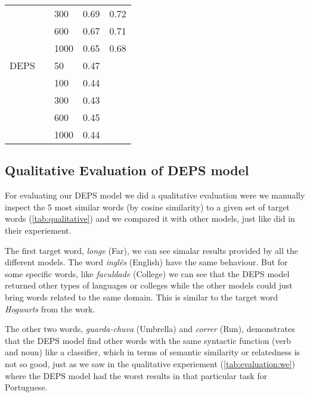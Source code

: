 \begin{table}[]
\begin{minipage}{.65\textwidth}
\begin{tabular}{@{}lllll@{}}
                    &               & 300  & 0.69             & 0.72            \\
                    &               & 600  & 0.67             & 0.71            \\
                    &               & 1000 & 0.65             & 0.68            \\ \cmidrule(r){1-5}
DEPS                &               & 50   & 0.47             \\
                    &               & 100  & 0.44             \\
                    &               & 300  & 0.43             \\
                    &               & 600  & 0.45             \\
                    &               & 1000 & 0.44             \\ \cmidrule(r){1-5}
\end{tabular}
\end{minipage}
\end{table}


\subsection{Qualitative Evaluation of DEPS model}\label{chap:results:qualitative}

For evaluating our DEPS model we did a qualitative evaluation were we manually inspect the 5 most similar words (by cosine similarity) to a given set of target words (\autoref{tab:qualitative}) and we compared it with other models, just like  did in their experiement.

The first target word, \textit{longe} (Far), we can see simalar results provided by all the different models. The word \textit{inglês} (English) have the same behaviour. But for some specific words, like \textit{faculdade} (College) we can see that the DEPS model returned other types of languages or colleges while the other models could just bring words related to the same domain. This is similar to the target word \textit{Hogwarts} from the  work.

The other two words, \textit{guarda-chuva} (Umbrella) and \textit{correr} (Run), demonstrates that the DEPS model find other words with the same syntactic function (verb and noun) like a classifier, which in terms of semantic similarity or relatedness is not so good, just as we saw in the qualitative experiement (\autoref{tab:evaluation:we}) where the DEPS model had the worst results in that particular task for Portuguese.

